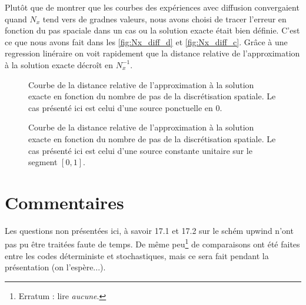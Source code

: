 \documentclass[11pt,a4paper]{article}
\begin{document}
Plutôt que de montrer que les courbes des expériences avec diffusion convergaient quand $N_x$ tend vers de gradnes valeurs, nous avons choisi de tracer l'erreur en fonction du pas spaciale dans un cas ou la solution exacte était bien définie. C'est ce que nous avons fait dans les \autoref{fig:Nx_diff_d} et \autoref{fig:Nx_diff_c}. Grâce à une regression linéraire on voit rapidement que la distance relative de l'approximation à la solution exacte décroît en $N_x^{-1}$.

\begin{figure}
  \centering
  
  \caption{Courbe de la distance relative de l'approximation à la solution exacte en fonction du nombre de pas de la discrétisation spatiale. Le cas présenté ici est celui d'une source ponctuelle en 0.}
  \label{fig:Nx_diff_d}
\end{figure}

\begin{figure}
  \centering
  
  \caption{Courbe de la distance relative de l'approximation à la solution exacte en fonction du nombre de pas de la discrétisation spatiale. Le cas présenté ici est celui d'une source constante unitaire sur le segment $[0,1]$.}
  \label{fig:Nx_diff_d}
\end{figure}




\section{Commentaires}
Les questions non présentées ici, à savoir 17.1 et 17.2 sur le schém upwind n'ont pas pu être traitées faute de temps. De même peu\footnote{Erratum : lire \emph{aucune}.} de comparaisons ont été faites entre les codes déterministe et stochastiques, mais ce sera fait pendant la présentation (on l'espère...).
\end{document}
